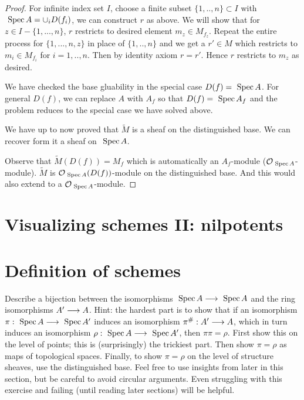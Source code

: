 \documentclass[11pt,fleqn]{book} %
\begin{document}
\begin{proof}
For infinite index set $I$, choose a finite subset $\{1,..,n\}\subset I$ with $\text{ Spec\,} A=\cup_i D(f_i)$, we can construct $r$ as above. We will show that for $z\in I-\{1,...,n\}$, $r$ restricts to desired element $m_z\in M_{f_z}$. Repeat the entire process for $\{1,...,n,z\}$ in place of $\{1,..,n\}$ and we get a $r'\in M$ which restricts to $m_i\in M_{f_i}$ for $i=1,..,n$. Then by identity axiom $r=r'$. Hence $r$ restricts to $m_z$ as desired.

We have checked the base gluability in the special case $D(f)=\text{ Spec\,} A$. For general $D(f)$, we can replace $A$ with $A_f$ so that $D(f)=\text{ Spec\,} A_f$ and the problem reduces to the special case we have solved above.

We have up to now proved that $\tilde{M}$ is a sheaf on the distinguished base. We can recover form it a sheaf on $\text{ Spec\,} A$.

Observe that $\tilde{M}(D(f))=M_f$ which is automatically an $A_f$-module (${\cal O}_{\text{ Spec\,} A}$-module). $\tilde{M}$ is ${\cal O}_{\text{ Spec\,} A}(D(f))$-module on the distinguished base. And this would also extend to a ${\cal O}_{\text{ Spec\,} A}$-module.
\end{proof}





\section{Visualizing schemes II: nilpotents}
\section{Definition of schemes
}

\begin{exr}
Describe a bijection between the isomorphisms $\text{ Spec\,} A \longrightarrow \text{ Spec\,} A$ and the ring isomorphisms $A' \longrightarrow A$. Hint: the hardest part is to show that if an isomorphism $\pi: \text{ Spec\,} A\longrightarrow \text{ Spec\,} A'$ induces an isomorphism $\pi^\#:A' \longrightarrow A$, which in turn induces an isomorphism $\rho: \text{ Spec\,} A \longrightarrow  \text{ Spec\,} A'$, then $π\pi = \rho$. First show this on the level of points; this is (surprisingly) the trickiest part. Then show $\pi = \rho$ as maps of topological spaces. Finally, to show $\pi = \rho$ on the level of structure sheaves, use the distinguished base. Feel free to use insights from later in this section, but be careful to avoid circular arguments. Even struggling with this exercise and failing (until reading later sections) will be helpful.
\end{exr}
\end{document}
